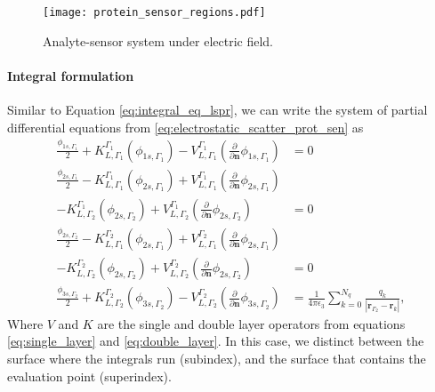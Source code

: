 \begin{figure}[h] %
    \centering
    \texttt{[image: protein\_sensor\_regions.pdf]} 
    \caption{Analyte-sensor system under electric field.}
    \label{fig:analyte-sensor}
 \end{figure}

\paragraph{Integral formulation}

Similar to Equation \eqref{eq:integral_eq_lspr}, we can write the system of partial differential equations from \eqref{eq:electrostatic_scatter_prot_sen} as
%
\begin{align} \label{eq:integral_eq_lspr_nobc_system}
\frac{\phi_{1s,\Gamma_1}}{2}+ K_{L,\Gamma_1}^{\Gamma_1}(\phi_{1s,\Gamma_1}) - V_{L,\Gamma_1}^{\Gamma_1} \left(\frac{\partial}{\partial \mathbf{n}}\phi_{1s,\Gamma_1} \right) &= 0  \nonumber \\
\frac{\phi_{2s,\Gamma_1}}{2} - K_{L,\Gamma_1}^{\Gamma_1}(\phi_{2s,\Gamma_1}) + V_{L,\Gamma_1}^{\Gamma_1} \left(\frac{\partial}{\partial \mathbf{n}}\phi_{2s,\Gamma_1} \right) \nonumber\\
 - K_{L,\Gamma_2}^{\Gamma_1}(\phi_{2s,\Gamma_2}) + V_{L,\Gamma_2}^{\Gamma_1} \left(\frac{\partial}{\partial \mathbf{n}}\phi_{2s,\Gamma_2} \right) &= 0  \nonumber \\
\frac{\phi_{2s,\Gamma_2}}{2} - K_{L,\Gamma_1}^{\Gamma_2}(\phi_{2s,\Gamma_1}) + V_{L,\Gamma_1}^{\Gamma_2} \left(\frac{\partial}{\partial \mathbf{n}}\phi_{2s,\Gamma_1} \right) \nonumber \\ 
- K_{L,\Gamma_2}^{\Gamma_2}(\phi_{2s,\Gamma_2}) + V_{L,\Gamma_2}^{\Gamma_2} \left(\frac{\partial}{\partial \mathbf{n}}\phi_{2s,\Gamma_2} \right) &= 0  \nonumber \\
\frac{\phi_{3s,\Gamma_2}}{2} + K_{L,\Gamma_2}^{\Gamma_2}(\phi_{3s,\Gamma_2}) - V_{L,\Gamma_2}^{\Gamma_2} \left( \frac{\partial}{\partial \mathbf{n}} \phi_{3s,\Gamma_2} \right) &= \frac{1}{4\pi\epsilon_3} \sum_{k=0}^{N_q} \frac{q_k}{|\mathbf{r}_{\Gamma_2} - \mathbf{r}_k|} ,
\end{align}
%
Where $V$ and $K$ are the single and double layer operators from equations 
\eqref{eq:single_layer} and \eqref{eq:double_layer}. In this case, we distinct between the
surface where the integrals run (subindex), and the surface that contains the evaluation point (superindex).

